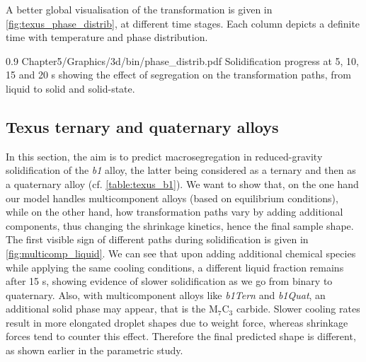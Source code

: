 A better global visualisation of the transformation is given in \cref{fig:texus_phase_distrib}, at different time stages.
Each column depicts a definite time with temperature and phase distribution. 


\begin{figureth}
{0.9}
{Chapter5/Graphics/3d/bin/phase_distrib.pdf}
{Solidification progress at 5, 10, 15 and 20 s showing the effect of segregation on the transformation paths, from liquid to solid and solid-state.}
\label{fig:texus_phase_distrib}
\end{figureth}


\subsection{Texus ternary and quaternary alloys}

In this section, the aim is to predict macrosegregation in reduced-gravity solidification of the \emph{b1} alloy, the latter being considered 
as a ternary and then as a quaternary alloy (cf. \cref{table:texus_b1}). 
We want to show that, on the one hand our model handles multicomponent alloys (based on equilibrium conditions), while
on the other hand, how transformation paths vary by adding additional components, thus changing the shrinkage kinetics, hence the final sample shape.
The first visible sign of different paths during solidification is given in \cref{fig:multicomp_liquid}. We can see that upon adding
additional chemical species while applying the same cooling conditions, a different liquid fraction remains after 15 s, showing evidence 
of slower solidification as we go from binary to quaternary. Also, with multicomponent alloys like \emph{b1Tern} and \emph{b1Quat}, an additional solid
phase may appear, that is the M$_7$C$_3$ carbide.
Slower cooling rates result in more elongated droplet shapes due to weight force, whereas shrinkage forces tend to counter this effect.
Therefore the final predicted shape is different, as shown earlier in the parametric study.

